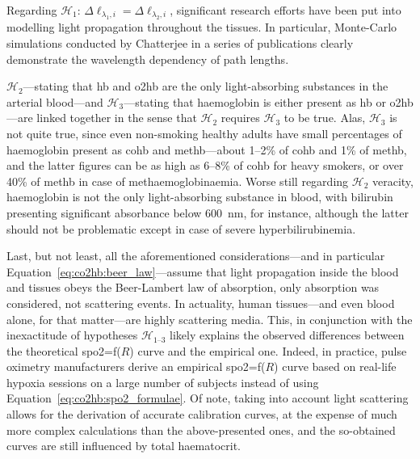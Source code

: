 Regarding $\mathcal{H}_1$: $\Delta\ell_{\lambda_1, i} = \Delta\ell_{\lambda_2, i}$, significant research efforts have been put into modelling light propagation throughout the tissues. In particular, Monte-Carlo simulations conducted by Chatterjee \etal{} in a series of publications\cite{chatterjee2017, chatterjee2018, chatterjee2019, chatterjee2020} clearly demonstrate the wavelength dependency of path lengths.

$\mathcal{H}_2$---stating that \gls{hb} and \gls{o2hb} are the only light-absorbing substances in the arterial blood---and $\mathcal{H}_3$---stating that haemoglobin is either present as \gls{hb} or \gls{o2hb}---are linked together in the sense that $\mathcal{H}_2$ requires $\mathcal{H}_3$ to be true. Alas, $\mathcal{H}_3$ is not quite true, since even non-smoking healthy adults have small percentages of haemoglobin present as \gls{cohb} and \gls{methb}---about 1--2\% of \gls{cohb} and 1\% of \gls{methb}, and the latter figures can be as high as 6--8\% of \gls{cohb} for heavy smokers, or over 40\% of \gls{methb} in case of methaemoglobinaemia\cite{nordenberg1990, ashbernal2004, remigio2022}. Worse still regarding $\mathcal{H}_2$ veracity, haemoglobin is not the only light-absorbing substance in blood, with bilirubin presenting significant absorbance below 600~nm, for instance, although the latter should not be problematic except in case of severe hyperbilirubinemia\cite{beall1989, veyckemans1990, meinke2007}.

Last, but not least, all the aforementioned considerations---and in particular Equation~\ref{eq:co2hb:beer_law}---assume that light propagation inside the blood and tissues obeys the Beer-Lambert law of absorption, \ie{} only absorption was considered, not scattering events. In actuality, human tissues---and even blood alone, for that matter---are highly scattering media\cite{jacques2013, bosschaart2014}. This, in conjunction with the inexactitude of hypotheses $\mathcal{H}_\text{1--3}$ likely explains the observed differences between the theoretical \gls{spo2}=f($R$) curve and the empirical one. Indeed, in practice, pulse oximetry manufacturers derive an empirical \gls{spo2}=f($R$) curve based on real-life hypoxia sessions on a large number of subjects instead of using Equation~\ref{eq:co2hb:spo2_formulae}\cite[Chap.~10]{webster1997design}. Of note, taking into account light scattering allows for the derivation of accurate calibration curves, at the expense of much more complex calculations than the above-presented ones\cite{schmitt1991}, and the so-obtained curves are still influenced by total haematocrit\cite{mannheimer1997}.

